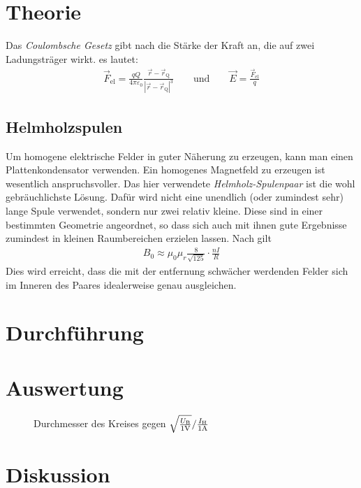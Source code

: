 \documentclass[12pt,a4paper,titlepage,headinclude,bibtotoc]{scrartcl}
\begin{document}
\section{Theorie}
\label{sec:theorie}
Das \emph{Coulombsche Gesetz} gibt nach \cite[S. 2]{demtroeder2} die Stärke der Kraft an, die auf zwei Ladungsträger wirkt.
es lautet:
\begin{align*}
	\vec F_\text{el}=\frac{qQ}{4\pi\varepsilon_0}\frac{\vec r-\vec r_\text{Q}}{|\vec r-\vec r_\text{Q}|^3}\qquad\text{und}\qquad\vec E =\frac{\vec F_\text{el}}{q}
\end{align*}
\subsection{Helmholzspulen}
Um homogene elektrische Felder in guter Näherung zu erzeugen, kann man einen Plattenkondensator verwenden.
Ein homogenes Magnetfeld zu erzeugen ist wesentlich anspruchsvoller. 
Das hier verwendete \emph{Helmholz-Spulenpaar} ist die wohl gebräuchlichste Lösung.
Dafür wird nicht eine unendlich (oder zumindest sehr) lange Spule verwendet, sondern nur zwei relativ kleine.
Diese sind in einer bestimmten Geometrie angeordnet, so dass sich auch mit ihnen gute Ergebnisse zumindest in kleinen Raumbereichen erzielen lassen.
Nach \cite[S. 94]{demtroeder2} gilt
\begin{align*}
	B_0\approx\mu_0\mu_r\frac{8}{\sqrt {125}}\cdot\frac{nI}{R}
\end{align*}
Dies wird erreicht, dass die mit der entfernung schwächer werdenden Felder sich im Inneren des Paares idealerweise genau ausgleichen.

\section{Durchführung}
\label{sec:durchfuehrung}

\section{Auswertung}
\label{sec:auswertung}
\begin{figure}[!h]
	\centering
	
	\caption{Durchmesser des Kreises gegen $\sqrt{\frac{U_\text{B}}{1\text V}}/\frac{I_\text{H}}{1\text A}$}
	\label{fig:UConst}
\end{figure}

\section{Diskussion}
\label{sec:diskussion}


\end{document}
